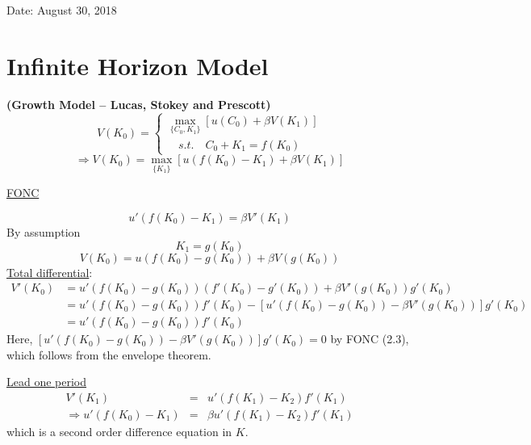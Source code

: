 \documentclass[twoside]{article}
\begin{document}

\hfill Date: August 30, 2018

\section{Infinite Horizon Model}
{\bf (Growth Model -- Lucas, Stokey and Prescott)}
\begin{equation}
    V(K_0) = \begin{cases}
        \max\limits_{\{C_0, K_1\}} [u(C_0)+ \beta V(K_1)]\\
        \quad s.t. \quad C_0 + K_1 = f(K_0)
    \end{cases}
\end{equation}
\begin{equation}
    \Longrightarrow V(K_0) = \max\limits_{\{ K_1\}} [u(f(K_0)-K_1)+ \beta V(K_1)]
\end{equation}

\underline{FONC}

\begin{equation}
    u'(f(K_0)-K_1) = \beta V'(K_1)
\end{equation}
By assumption
\begin{equation}
    K_1 = g(K_0)
\end{equation}
\begin{equation}
    V(K_0) = u(f(K_0)-g(K_0)) + \beta V(g(K_0))
\end{equation}
\underline{Total differential}:
\begin{equation}
    \begin{aligned}
        V'(K_0) &= u'(f(K_0)-g(K_0))(f'(K_0) - g'(K_0))+ \beta V'(g(K_0))g'(K_0)\\
        &= u'(f(K_0)-g(K_0))  f'(K_0) - [u'(f(K_0)-g(K_0))- \beta V'(g(K_0)) ]  g'(K_0)\\
        &= u'(f(K_0)-g(K_0))  f'(K_0)
    \end{aligned}
\end{equation}
Here, $[u'(f(K_0)-g(K_0))- \beta V'(g(K_0)) ]  g'(K_0) = 0$ by FONC (2.3), which follows from the envelope theorem.

\underline{Lead one period}
\begin{eqnarray}
    V'(K_1) &=& u'(f(K_1)-K_2)  f'(K_1)\\
    \Longrightarrow u'(f(K_0)-K_1) &=& \beta u'(f(K_1)-K_2)  f'(K_1)
\end{eqnarray}
which is a second order difference equation in $K$.
\end{document}
